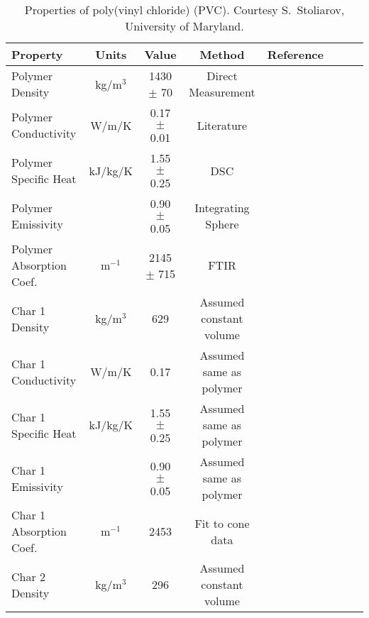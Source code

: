 \begin{table}[h!]
\caption[Properties of poly(vinyl chloride) (PVC).]{Properties of poly(vinyl chloride) (PVC). Courtesy S.~Stoliarov, University of Maryland.}
\begin{center}
\begin{tabular}{|l|c|c|c|c|c|l|l|}
\hline
Property                    & Units         & Value                             & Method                    &  Reference                    \\ \hline \hline
Polymer Density             & kg/m$^3$      & 1430 $\pm$ 70                     & Direct Measurement        &  \cite{Stoliarov:CF2010}      \\ \hline
Polymer Conductivity        & W/m/K         & 0.17 $\pm$ 0.01                   & Literature                &  \cite{Stoliarov:CF2010}      \\ \hline
Polymer Specific Heat       & kJ/kg/K       & 1.55 $\pm$ 0.25                   & DSC                       &  \cite{Stoliarov:PDS2008}     \\ \hline
Polymer Emissivity          &               & 0.90 $\pm$ 0.05                   & Integrating Sphere        &  \cite{Hallman:PES1974}       \\ \hline
Polymer Absorption Coef.    & m$^{-1}$      & 2145 $\pm$ 715                    & FTIR                      &  \cite{Tsilingiris:ECM2003}   \\ \hline
Char 1 Density              & kg/m$^3$      & 629                               & Assumed constant volume   &  \cite{Stoliarov:CF2010}      \\ \hline
Char 1 Conductivity         & W/m/K         & 0.17                              & Assumed same as polymer   &  \cite{Stoliarov:CF2010}      \\ \hline
Char 1 Specific Heat        & kJ/kg/K       & 1.55 $\pm$ 0.25                   & Assumed same as polymer   &  \cite{Stoliarov:CF2010}      \\ \hline
Char 1 Emissivity           &               & 0.90 $\pm$ 0.05                   & Assumed same as polymer   &  \cite{Stoliarov:CF2010}      \\ \hline
Char 1 Absorption Coef.     & m$^{-1}$      & 2453                              & Fit to cone data          &  \cite{Stoliarov:CF2010}      \\ \hline
Char 2 Density              & kg/m$^3$      & 296                               & Assumed constant volume   &  \cite{Stoliarov:CF2010}      \\ \hline

\end{tabular}
\end{center}
\end{table}

